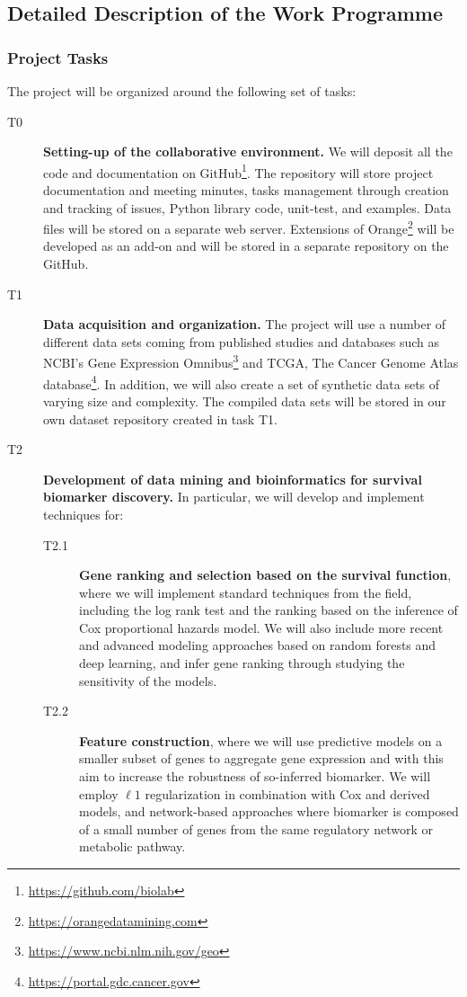 \documentclass[11pt,a4paper]{article}
\newcommand{\myurl}[1]{\footnote{\url{#1}}}
\renewcommand{\bold}{\textbf}
\begin{document}
\subsection{Detailed Description of the Work Programme}

\subsubsection{Project Tasks}

The project will be organized around the following set of tasks:
\begin{description}
	\item[T0] \bold{Setting-up of the collaborative environment.} We will deposit all the code and documentation on GitHub\myurl{https://github.com/biolab}. The repository will store project documentation and meeting minutes, tasks management through creation and tracking of issues, Python library code, unit-test, and examples. Data files will be stored on a separate web server. Extensions of Orange\myurl{https://orangedatamining.com} will be developed as an add-on and will be stored in a separate repository on the GitHub.
	\item[T1] \bold{Data acquisition and organization.} The project will use a number of different data sets coming from published studies and databases such as NCBI's Gene Expression Omnibus\myurl{https://www.ncbi.nlm.nih.gov/geo} and TCGA, The Cancer Genome Atlas database\myurl{https://portal.gdc.cancer.gov}. In addition, we will also create a set of synthetic data sets of varying size and complexity. The compiled data sets will be stored in our own dataset repository created in task T1.
	\item[T2] \bold{Development of data mining and bioinformatics for survival biomarker discovery.} In particular, we will develop and implement techniques for:
	\begin{description}
		\item[T2.1] \bold{Gene ranking and selection based on the survival function}, where we will implement standard techniques from the field, including the log rank test and the ranking based on the inference of Cox proportional hazards model. We will also include more recent and advanced modeling approaches based on random forests and deep learning, and infer gene ranking through studying the sensitivity of the models.
		\item[T2.2] \bold{Feature construction}, where we will use predictive models on a smaller subset of genes to aggregate gene expression and with this aim to increase the robustness of so-inferred biomarker. We will employ $\ell 1$ regularization in combination with Cox and derived models, and network-based approaches where biomarker is composed of a small number of genes from the same regulatory network or metabolic pathway.

\end{description}
\end{description}
\end{document}
